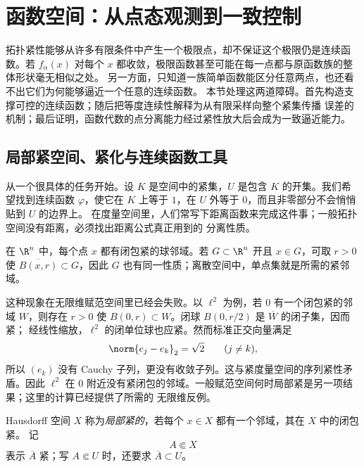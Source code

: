 \section{函数空间：从点态观测到一致控制}\label{sec:01-03}

拓扑紧性能够从许多有限条件中产生一个极限点，却不保证这个极限仍是连续函数。若
$f_\alpha(x)$ 对每个 $x$ 都收敛，极限函数甚至可能在每一点都与原函数族的整体形状毫无相似之处。
另一方面，只知道一族简单函数能区分任意两点，也还看不出它们为何能够逼近一个任意的连续函数。
本节处理这两道障碍。首先构造支撑可控的连续函数；随后把等度连续性解释为从有限采样向整个紧集传播
误差的机制；最后证明，函数代数的点分离能力经过紧性放大后会成为一致逼近能力。

\subsection{局部紧空间、紧化与连续函数工具}\label{subsec:1-3-1}

从一个很具体的任务开始。设 $K$ 是空间中的紧集，$U$ 是包含 $K$ 的开集。我们希望找到连续函数
$\varphi$，使它在 $K$ 上等于 $1$，在 $U$ 外等于 $0$，而且非零部分不会悄悄贴到 $U$ 的边界上。
在度量空间里，人们常写下距离函数来完成这件事；一般拓扑空间没有距离，必须找出距离公式真正用到的
分离性质。

\begin{example}\label{ex:1-3-1-1}
在 $\R^n$ 中，每个点 $x$ 都有闭包紧的球邻域。若 $G\subset\R^n$ 开且 $x\in G$，可取 $r>0$
使 $\overline{B(x,r)}\subset G$，因此 $G$ 也有同一性质；离散空间中，单点集就是所需的紧邻域。

这种现象在无限维赋范空间里已经会失败。以 $\ell^2$ 为例，若 $0$ 有一个闭包紧的邻域 $W$，则存在
$r>0$ 使 $B(0,r)\subset W$。闭球 $\overline{B(0,r/2)}$ 是 $\overline W$ 的闭子集，因而紧；
经线性缩放，$\ell^2$ 的闭单位球也应紧。然而标准正交向量满足
\[
  \norm{e_j-e_k}_2=\sqrt2\qquad(j\ne k),
\]
所以 $(e_k)$ 没有 Cauchy 子列，更没有收敛子列。这与紧度量空间的序列紧性矛盾。因此 $\ell^2$
在 $0$ 附近没有紧闭包的邻域。一般赋范空间何时局部紧是另一项结果；这里的计算已经提供了所需的
无限维反例。
\end{example}

\begin{definition}\label{def:1-3-1-1}
Hausdorff 空间 $X$ 称为\emph{局部紧的}，若每个 $x\in X$ 都有一个邻域，其在 $X$ 中的闭包紧。
记
\[
  A\Subset X
\]
表示 $\overline A$ 紧；写 $A\Subset U$ 时，还要求 $\overline A\subset U$。
\end{definition}

